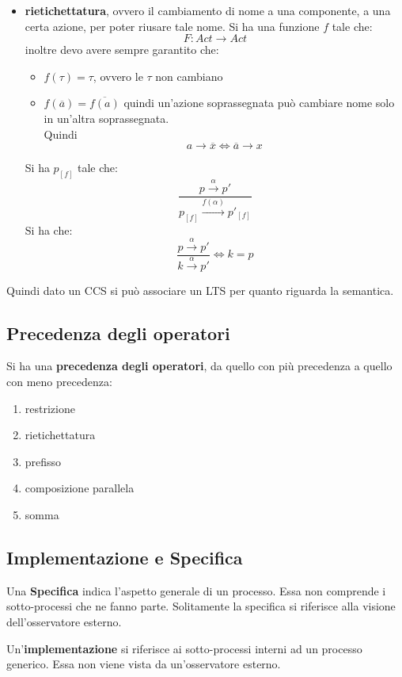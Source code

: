 \begin{itemize}
  \item \textbf{rietichettatura}, ovvero il cambiamento di nome a una
  componente, a una certa azione, per poter riusare tale nome. Si ha una
  funzione $f$ tale che:
  \[F:Act\to Act\]
  inoltre devo avere sempre garantito che:
  \begin{itemize}
    \item $f(\tau)=\tau$, ovvero le $\tau$ non cambiano
    \item $f(\overline{a})=\overline{f(a)}$ quindi un'azione soprassegnata può
    cambiare nome solo in un'altra soprassegnata. \\ Quindi \[a\to \overline{x} \iff \overline{a}\to x\]
  \end{itemize}
  Si ha $p_{[f]}$ tale che:
  \[\frac{p\stackrel{\alpha}{\rightarrow}p'}{p_{[f]}
      \stackrel{f(\alpha)}{\rightarrow}p'_{[f]}}\]
  Si ha che:
  \[\frac{p\stackrel{\alpha}{\rightarrow}p'}{k
      \stackrel{\alpha}{\rightarrow}p'}\iff k=p\]
\end{itemize}
Quindi dato un CCS si può associare un LTS per quanto riguarda la semantica.\\
\subsection{Precedenza degli operatori}
Si ha una \textbf{precedenza degli operatori}, da quello con più precedenza a
quello con meno precedenza: 
\begin{enumerate}
  \item restrizione
  \item rietichettatura
  \item prefisso
  \item composizione parallela
  \item somma
\end{enumerate}
\subsection{Implementazione e Specifica}
\begin{definizione}
  Una \textbf{Specifica} indica l'aspetto generale di un processo. Essa non comprende i sotto-processi che ne fanno parte. Solitamente la specifica si riferisce alla visione dell'osservatore esterno.
\end{definizione}
\begin{definizione}
  Un'\textbf{implementazione} si riferisce ai sotto-processi interni ad un processo generico. Essa non viene vista da un'osservatore esterno.
\end{definizione}
